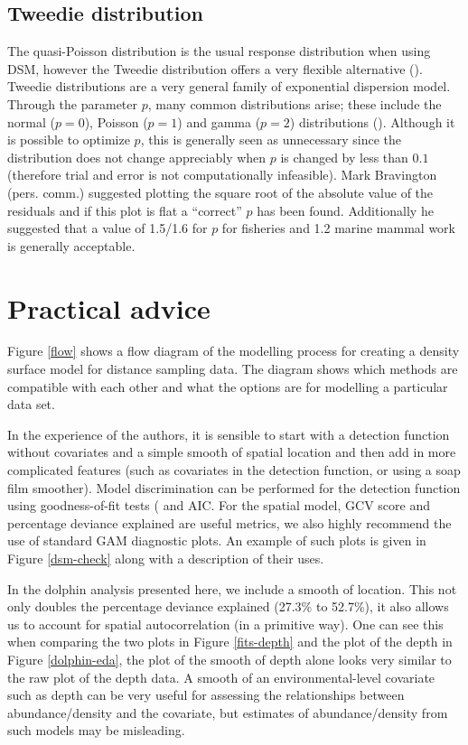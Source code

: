 \documentclass[a4paper,12pt]{article}
\begin{document}
\subsection*{Tweedie distribution}
\label{s:Tweedie}

The quasi-Poisson distribution is the usual response distribution when using DSM, however the Tweedie distribution offers a very flexible alternative (\cite{Candy:2004tb}). Tweedie distributions are a very general family of exponential dispersion model. Through the parameter $p$, many common distributions arise; these include the normal ($p=0$), Poisson ($p=1$) and gamma ($p=2$) distributions (\cite{Jorgensen:1987vg}). Although it is possible to optimize $p$, this is generally seen as unnecessary since the distribution does not change appreciably when $p$ is changed by less than $0.1$ (therefore trial and error is not computationally infeasible). Mark Bravington (pers. comm.) suggested plotting the square root of the absolute value of the residuals and if this plot is flat a ``correct'' $p$ has been found. Additionally he suggested that a value of 1.5/1.6 for $p$ for fisheries and 1.2 marine mammal work is generally acceptable.


\section*{Practical advice}
\label{s:practical}

Figure \ref{flow} shows a flow diagram of the modelling process for creating a density surface model for distance sampling data. The diagram shows which methods are compatible with each other and what the options are for modelling a particular data set.

In the experience of the authors, it is sensible to start with a detection function without covariates and a simple smooth of spatial location and then add in more complicated features (such as covariates in the detection function, or using a soap film smoother). Model discrimination can be performed for the detection function using goodness-of-fit tests (\cite{Buckland:2004ts} and AIC. For the spatial model, GCV score and percentage deviance explained are useful metrics, we also highly recommend the use of standard GAM diagnostic plots. An example of such plots is given in Figure \ref{dsm-check} along with a description of their uses.

In the dolphin analysis presented here, we include a smooth of location. This not only doubles the percentage deviance explained (27.3\% to 52.7\%), it also allows us to account for spatial autocorrelation (in a primitive way). One can see this when comparing the two plots in Figure \ref{fits-depth} and the plot of the depth in Figure \ref{dolphin-eda}, the plot of the smooth of depth alone looks very similar to the raw plot of the depth data. A smooth of an environmental-level covariate such as depth can be very useful for assessing the relationships between abundance/density and the covariate, but estimates of abundance/density from such models may be misleading.
\end{document}
